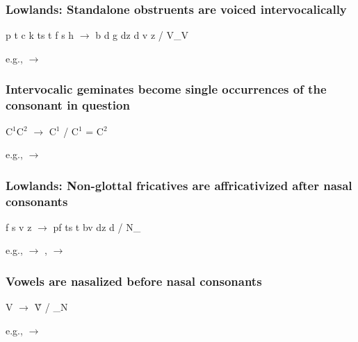 \subsubsection{{\sc Lowlands:} Standalone obstruents are voiced intervocalically} 

\begin{center}
    p t c k t\tiebar s t\tiebar\esh{} f s \esh{} h $\to$ b d \paljstop{} g d\tiebar z d\tiebar\ezh{} v z \ezh{} \voih{} / V\_V
\end{center}

e.g.,   $\to$  

\subsubsection{Intervocalic geminates become single occurrences of the consonant in question}

\begin{center}
    C$^1$C$^2$ $\to$ C$^1$ / C$^1$ = C$^2$
\end{center}

e.g.,   $\to$ 

\subsubsection{{\sc Lowlands:} Non-glottal fricatives are affricativized after nasal consonants}

\begin{center}
    f s \esh{} v z \ezh{} $\to$ p\tiebar f t\tiebar s t\tiebar\esh{} b\tiebar v d\tiebar z d\tiebar\ezh{} / N\_ 
\end{center}

e.g.,   $\to$ ,   $\to$ 

\subsubsection{Vowels are nasalized before nasal consonants}

\begin{center}
    V $\to$ \~{V} / \_N
\end{center}

e.g.,   $\to$ 